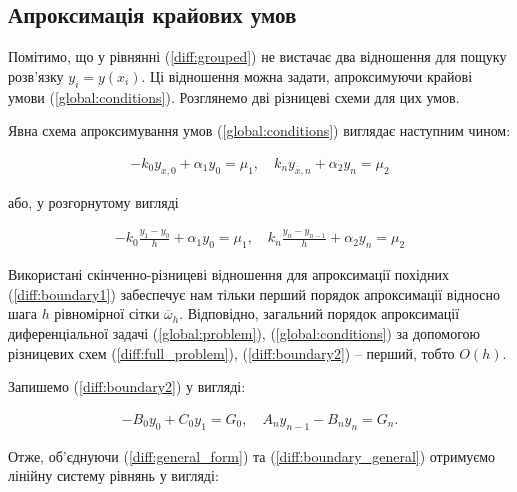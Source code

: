 \subsection{Апроксимація крайових умов}

Помітимо, що у рівнянні (\ref{diff:grouped}) не вистачає два відношення для пощуку розв'язку \( y_i = y(x_i)\). Ці відношення можна задати, апроксимуючи крайові умови (\ref{global:conditions}). Розглянемо дві різницеві схеми для цих умов.

\bigskip

Явна схема апроксимування умов (\ref{global:conditions}) виглядає наступним чином:

\begin{equation}
\begin{split} \label{diff:boundary1}
-k_0 y_{x,0} + \alpha_1 y_0 = \mu_1, \quad
k_n y_{\overline{x}, n} + \alpha_2 y_n = \mu_2
\end{split}
\end{equation}

\newpage

або, у розгорнутому вигляді

\begin{equation}
\begin{split} \label{diff:boundary2}
-k_0 \frac{y_1 - y_0}{h} + \alpha_1 y_0 = \mu_1, \quad
k_n \frac{y_n - y_{n-1}}{h} + \alpha_2 y_n = \mu_2
\end{split}
\end{equation}

Використані скінченно-різницеві відношення для апроксимації похідних (\ref{diff:boundary1}) забеспечує нам тільки перший порядок апроксимації відносно шага \(h\) рівномірної сітки \(\overline{\omega}_h\). Відповідно, загальний порядок апроксимації диференціальної задачі (\ref{global:problem}), (\ref{global:conditions}) за допомогою різницевих схем (\ref{diff:full_problem}), (\ref{diff:boundary2}) -- перший, тобто \(O(h)\).

\bigskip

Запишемо (\ref{diff:boundary2}) у вигляді:

\begin{equation}
\begin{split} \label{diff:boundary_general}
-B_0y_0 + C_0y_1 = G_0, \quad A_ny_{n-1} - B_ny_n = G_n.
\end{split}
\end{equation}

Отже, об'єднуючи (\ref{diff:general_form}) та (\ref{diff:boundary_general}) отримуємо лінійну систему рівнянь у вигляді:

